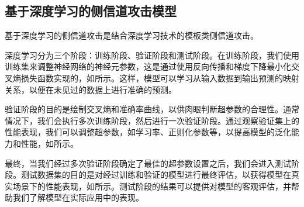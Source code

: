 {%
%	
	
	\subsection{基于深度学习的侧信道攻击模型}\label{subs:conceptdlsca}
	
	基于深度学习的侧信道攻击是结合深度学习技术的模板类侧信道攻击。
	
	
	深度学习分为三个阶段：训练阶段、验证阶段和测试阶段。在训练阶段，我们使用训练集来调整神经网络的神经元参数，这是通过使用反向传播和梯度下降最小化交叉熵损失函数实现的，如所示。这样，模型可以学习从输入数据到输出预测的映射关系，以便在未见过的数据上进行准确的预测。
	
	验证阶段的目的是绘制交叉熵和准确率曲线，以供肉眼判断超参数的合理性。通常情况下，我们会执行多次训练阶段，然后进行一次验证阶段。通过观察验证集上的性能表现，我们可以调整超参数，如学习率、正则化参数等，以提高模型的泛化能力和性能，如所示。
	
	最终，当我们经过多次验证阶段确定了最佳的超参数设置之后，我们会进入测试阶段。测试数据集的目的是对经过训练和验证的模型进行最终评估，以获得模型在真实场景下的性能表现，如所示。测试阶段的结果可以提供对模型的客观评估，并帮助我们了解模型在实际应用中的表现。
	
}
